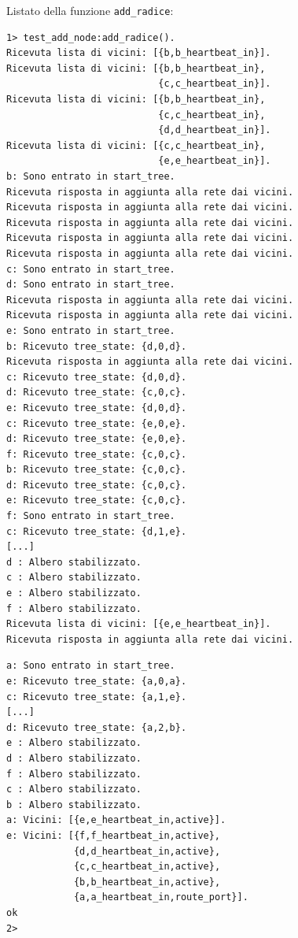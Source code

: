 \documentclass[italian]{memoir}
\begin{document}
Listato della funzione \texttt{add\_radice}:
\begin{tcolorbox}[colback=yellow!5!white,colframe=cyan!75!black,title=funzione \texttt{add\_radice} (1)]
\begin{center}
\begin{verbatim}
1> test_add_node:add_radice().
Ricevuta lista di vicini: [{b,b_heartbeat_in}].
Ricevuta lista di vicini: [{b,b_heartbeat_in},
                           {c,c_heartbeat_in}].
Ricevuta lista di vicini: [{b,b_heartbeat_in},
                           {c,c_heartbeat_in},
                           {d,d_heartbeat_in}].
Ricevuta lista di vicini: [{c,c_heartbeat_in},
                           {e,e_heartbeat_in}].
b: Sono entrato in start_tree.
Ricevuta risposta in aggiunta alla rete dai vicini.
Ricevuta risposta in aggiunta alla rete dai vicini.
Ricevuta risposta in aggiunta alla rete dai vicini.
Ricevuta risposta in aggiunta alla rete dai vicini.
Ricevuta risposta in aggiunta alla rete dai vicini.
c: Sono entrato in start_tree.
d: Sono entrato in start_tree.
Ricevuta risposta in aggiunta alla rete dai vicini.
Ricevuta risposta in aggiunta alla rete dai vicini.
e: Sono entrato in start_tree.
b: Ricevuto tree_state: {d,0,d}.
Ricevuta risposta in aggiunta alla rete dai vicini.
c: Ricevuto tree_state: {d,0,d}.
d: Ricevuto tree_state: {c,0,c}.
e: Ricevuto tree_state: {d,0,d}.
c: Ricevuto tree_state: {e,0,e}.
d: Ricevuto tree_state: {e,0,e}.
f: Ricevuto tree_state: {c,0,c}.
b: Ricevuto tree_state: {c,0,c}.
d: Ricevuto tree_state: {c,0,c}.
e: Ricevuto tree_state: {c,0,c}.
f: Sono entrato in start_tree.
c: Ricevuto tree_state: {d,1,e}.
[...]
d : Albero stabilizzato.
c : Albero stabilizzato.
e : Albero stabilizzato.
f : Albero stabilizzato.
Ricevuta lista di vicini: [{e,e_heartbeat_in}].
Ricevuta risposta in aggiunta alla rete dai vicini.
\end{verbatim}
\end{center}
\end{tcolorbox}
\begin{tcolorbox}[colback=yellow!5!white,colframe=cyan!75!black,title=funzione \texttt{add\_radice} (2)]
\begin{center}
\begin{verbatim}
a: Sono entrato in start_tree.
e: Ricevuto tree_state: {a,0,a}.
c: Ricevuto tree_state: {a,1,e}.
[...]
d: Ricevuto tree_state: {a,2,b}.
e : Albero stabilizzato.
d : Albero stabilizzato.
f : Albero stabilizzato.
c : Albero stabilizzato.
b : Albero stabilizzato.
a: Vicini: [{e,e_heartbeat_in,active}].
e: Vicini: [{f,f_heartbeat_in,active},
            {d,d_heartbeat_in,active},
            {c,c_heartbeat_in,active},
            {b,b_heartbeat_in,active},
            {a,a_heartbeat_in,route_port}].
ok
2>
\end{verbatim}
\end{center}
\end{tcolorbox}
\end{document}
